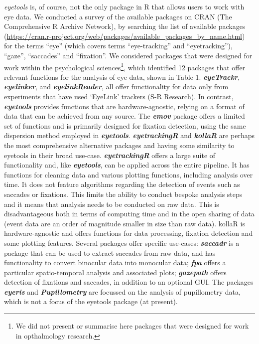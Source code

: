 \documentclass[
  man,
  floatsintext,
  longtable,
  nolmodern,
  notxfonts,
  notimes,
  colorlinks=true,linkcolor=blue,citecolor=blue,urlcolor=blue]{apa7}
\begin{document}
\emph{eyetools} is, of course, not the only package in R that allows
users to work with eye data. We conducted a survey of the available
packages on CRAN (The Comprehensive R Archive Network), by searching the
list of available packages
(\url{https://cran.r-project.org/web/packages/available_packages_by_name.html})
for the terms ``eye'' (which covers terms ``eye-tracking'' and
``eyetracking''), ``gaze'', ``saccades'' and ``fixation''. We considered
packages that were designed for work within the psychological
sciences\footnote{We did not present or summarise here packages that
  were designed for work in opthalmology research.}, which identified 12
packages that offer relevant functions for the analysis of eye data,
shown in Table 1. \textbf{\emph{eyeTrackr}}, \textbf{\emph{eyelinker}},
and \textbf{\emph{eyelinkReader}}, all offer functionality for data only
from experiments that have used `EyeLink' trackers (S-R Research). In
contrast, \textbf{\emph{eyetools}} provides functions that are
hardware-agnostic, relying on a format of data that can be achieved from
any source. The \textbf{\emph{emov}} package offers a limited set of
functions and is primarily designed for fixation detection, using the
same dispersion method employed in \textbf{\emph{eyetools}}.
\textbf{\emph{eyetrackingR}} and \textbf{\emph{kollaR}} are perhaps the
most comprehensive alternative packages and having some similarity to
eyetools in their broad use-case. \textbf{\emph{eyetrackingR}} offers a
large suite of functionality and, like \textbf{\emph{eyetools}}, can be
applied across the entire pipeline. It has functions for cleaning data
and various plotting functions, including analysis over time. It does
not feature algorithms regarding the detection of events such as
saccades or fixations. This limits the ability to conduct bespoke
analysis steps and it means that analysis needs to be conducted on raw
data. This is disadvantageous both in terms of computing time and in the
open sharing of data (event data are an order of magnitude smaller in
size than raw data). kollaR is hardware-agnostic and offers functions
for data processing, fixation detection and some plotting features.
Several packages offer specific use-cases: \textbf{\emph{saccadr}} is a
package that can be used to extract saccades from raw data, and has
functionality to convert binocular data into monocular data;
\textbf{\emph{fpa}} offers a particular spatio-temporal analysis and
associated plots; \textbf{\emph{gazepath}} offers detection of fixations
and saccades, in addition to an optional GUI. The packages
\textbf{\emph{eyeris}} and \textbf{\emph{Pupillometry}} are focussed on
the analysis of pupillometry data, which is not a focus of the eyetools
package (at present).
\end{document}
